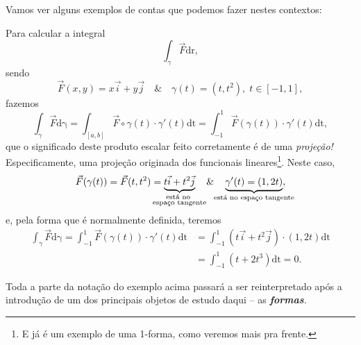 \documentclass[../differential_forms.tex]{subfiles}
\begin{document}
Vamos ver alguns exemplos de contas que podemos fazer nestes contextos:
\begin{example}
	Para calcular a integral
	\[
		\int_{\gamma }^{}\vec{F} \mathrm{dr},
	\]
	sendo
	\[
		\vec{F}(x, y) = x \vec{i} + y \vec{j} \quad\&\quad \gamma (t) = (t, t^{2}),\; t\in [-1, 1],
	\]
	fazemos
	\[
		\int_{\gamma }^{} \vec{F} \mathrm{d\gamma } = \int_{[a, b]}^{}\vec{F}\circ \gamma (t) \cdot \gamma'(t) \mathrm{dt} = \int_{-1}^{1}\vec{F}(\gamma (t))\cdot \gamma '(t) \mathrm{dt},
	\]
	que o significado deste produto escalar feito corretamente é de uma \textit{projeção!} Especificamente, uma projeção originada dos funcionais lineares\footnote{E já é um exemplo de uma 1-forma, como veremos mais pra frente.}. Neste caso,
	\[
		\vec{F}(\gamma (t)) = \vec{F}(t, t^{2}) = \underbrace{t \vec{i} + t^{2} \vec{j}}_{\mathclap{\substack{\text{está no } \\ \text{espaço tangente}}}} \quad\&\quad \underbrace{\gamma '(t) = (1, 2t)}_{\mathclap{\text{está no espaço tangente}}},
	\]
	e, pela forma que é normalmente definida, teremos
	\begin{align*}
		\int_{\gamma }^{}\vec{F} \mathrm{d\gamma } = \int_{-1}^{1} \vec{F}(\gamma (t))\cdot \gamma '(t) \mathrm{dt} & = \int_{-1}^{1}(t \vec{i} + t^{2}\vec{j})\cdot (1, 2t) \mathrm{dt} \\
		                                                                                                            & = \int_{-1}^{1} (t+2t^{3}) \mathrm{dt}  = 0.
	\end{align*}

\end{example}
\begin{tcolorbox}[
		skin=enhanced,
		title=Observação,
		fonttitle=\bfseries,
		colframe=black,
		colbacktitle=cyan!75!white,
		colback=cyan!15,
		colbacklower=black,
		coltitle=black,
		drop fuzzy shadow,
	]
	Toda a parte da notação do exemplo acima passará a ser reinterpretado após a introdução de um dos principais objetos de estudo daqui -- as \textbf{\textit{formas}}.
\end{tcolorbox}
\end{document}
